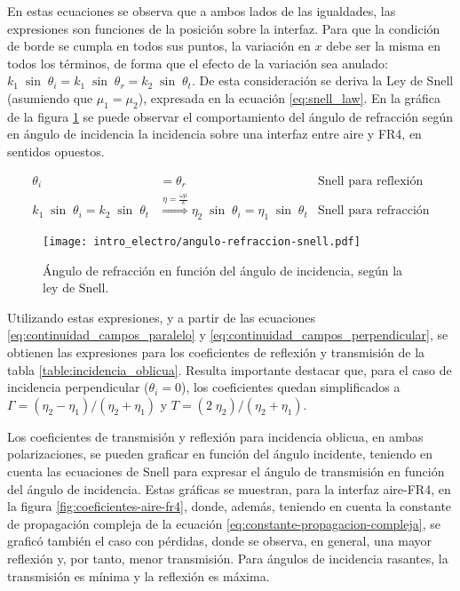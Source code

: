 En estas ecuaciones se observa que a ambos lados de las igualdades, las expresiones son funciones de la posición sobre la interfaz. Para que la condición de borde se cumpla en todos sus puntos, la variación en $x$ debe ser la misma en todos los términos, de forma que el efecto de la variación sea anulado: $k_1 \; \sin\; \theta_i = k_1 \; \sin \; \theta_r = k_2 \; \sin\; \theta_t$.  De esta consideración se deriva la Ley de Snell (asumiendo que $\mu_1 = \mu_2$), expresada en la ecuación \ref{eq:snell_law}. En la gráfica de la figura \ref{fig:ley_snell} se puede observar el comportamiento del ángulo de refracción según en ángulo de incidencia la incidencia sobre una interfaz entre aire y FR4, en sentidos opuestos.

\begin{subequations}
	\label{eq:snell_law}
	\begin{align}
	\theta_i &= \theta_r & \text{Snell para reflexión}\\
	k_1 \; \sin\; \theta_i = k_2 \; \sin\; \theta_t & \overset{\eta=\frac{\omega\mu}{k}}{\Longrightarrow} \eta_2 \; \sin\; \theta_i = \eta_1 \; \sin\; \theta_t & \text{Snell para refracción}\label{eq:snell_law_second}
	\end{align}
\end{subequations}

\begin{figure}[htp]
	\centering
	\texttt{[image: intro\_electro/angulo-refraccion-snell.pdf]}
	\caption{Ángulo de refracción en función del ángulo de incidencia, según la ley de Snell.}
	\label{fig:ley_snell}
\end{figure}

Utilizando estas expresiones, y a partir de las ecuaciones \ref{eq:continuidad_campos_paralelo} y \ref{eq:continuidad_campos_perpendicular}, se obtienen las expresiones para los coeficientes de reflexión y transmisión de la tabla \ref{table:incidencia_oblicua}. Resulta importante destacar que, para el caso de incidencia perpendicular ($\theta_i = 0$), los coeficientes quedan simplificados a $\Gamma = (\eta_2 - \eta_1)/(\eta_2 + \eta_1)$ y $T = (2 \; \eta_2)/(\eta_2 + \eta_1)$.

Los coeficientes de transmisión y reflexión para incidencia oblicua, en ambas polarizaciones, se pueden graficar en función del ángulo incidente, teniendo en cuenta las ecuaciones de Snell para expresar el ángulo de transmisión en función del ángulo de incidencia. Estas gráficas se muestran, para la interfaz aire-FR4, en la figura \ref{fig:coeficientes-aire-fr4}, donde, además,  teniendo en cuenta la constante de propagación compleja de la ecuación \ref{eq:constante-propagacion-compleja}, se graficó también el caso con pérdidas, donde se observa, en general, una mayor reflexión y, por tanto, menor transmisión. Para ángulos de incidencia rasantes, la transmisión es mínima y la reflexión es máxima.

